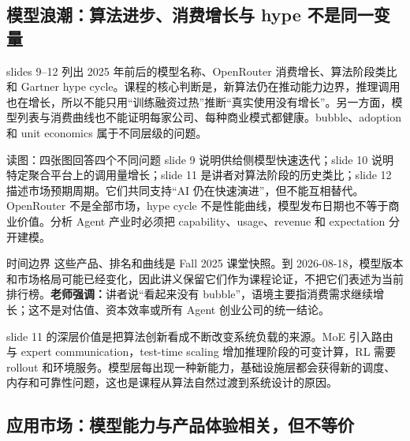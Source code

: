 \subsection{模型浪潮：算法进步、消费增长与 hype 不是同一变量}

slides 9--12 列出 2025 年前后的模型名称、OpenRouter 消费增长、算法阶段类比和 Gartner hype cycle。课程的核心判断是，新算法仍在推动能力边界，推理调用也在增长，所以不能只用“训练融资过热”推断“真实使用没有增长”。另一方面，模型列表与消费曲线也不能证明每家公司、每种商业模式都健康。bubble、adoption 和 unit economics 属于不同层级的问题。


\begin{knowledgebox}{读图：四张图回答四个不同问题}
slide 9 说明供给侧模型快速迭代；slide 10 说明特定聚合平台上的调用量增长；slide 11 是讲者对算法阶段的历史类比；slide 12 描述市场预期周期。它们共同支持“AI 仍在快速演进”，但不能互相替代。OpenRouter 不是全部市场，hype cycle 不是性能曲线，模型发布日期也不等于商业价值。分析 Agent 产业时必须把 capability、usage、revenue 和 expectation 分开建模。
\end{knowledgebox}

\begin{warningbox}{时间边界}
这些产品、排名和曲线是 Fall 2025 课堂快照。到 2026-08-18，模型版本和市场格局可能已经变化，因此讲义保留它们作为课程论证，不把它们表述为当前排行榜。\textbf{老师强调：}讲者说“看起来没有 bubble”，语境主要指消费需求继续增长；这不是对估值、资本效率或所有 Agent 创业公司的统一结论。
\end{warningbox}

slide 11 的深层价值是把算法创新看成不断改变系统负载的来源。MoE 引入路由与 expert communication，test-time scaling 增加推理阶段的可变计算，RL 需要 rollout 和环境服务。模型层每出现一种新能力，基础设施层都会获得新的调度、内存和可靠性问题，这也是课程从算法自然过渡到系统设计的原因。

\subsection{应用市场：模型能力与产品体验相关，但不等价}

